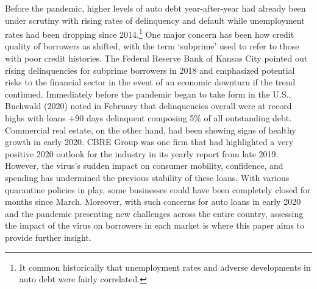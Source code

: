 \documentclass[10.5pt]{article}
\begin{document}
Before the pandemic, higher levels of auto debt year-after-year had already been under scrutiny with rising rates of delinquency and default while unemployment rates had been dropping since 2014.\footnote{It common historically that unemployment rates and adverse developments in auto debt were fairly correlated.} One major concern has been how credit quality of borrowers as shifted, with the term `subprime' used to refer to those with poor credit histories. The Federal Reserve Bank of Kansas City pointed out rising delinquencies for subprime borrowers in 2018 and emphasized potential risks to the financial sector in the event of an economic downturn if the trend continued. Immediately before the pandemic began to take form in the U.S., Buchwald (2020) noted in February that delinquencies overall were at record highs with loans +90 days delinquent composing 5\% of all outstanding debt. Commercial real estate, on the other hand, had been showing signs of healthy growth in early 2020. CBRE Group was one firm that had highlighted a very positive 2020 outlook for the industry in its yearly report from late 2019. However, the virus's sudden impact on consumer mobility, confidence, and spending has undermined the previous stability of these loans. With various quarantine policies in play, some businesses could have been completely closed for months since March. Moreover, with such concerns for auto loans in early 2020 and the pandemic presenting new challenges across the entire country, assessing the impact of the virus on borrowers in each market is where this paper aims to provide further insight. 
\end{document}
